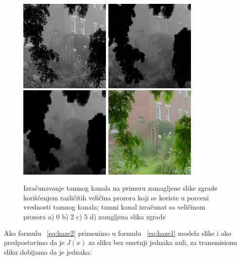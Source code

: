 \documentclass[a4paper,12pt,titlepage]{article}
\begin{document}
\begin{figure}[ht!]
\centering
\includegraphics[width=45mm]{img/hazeDC0.png}
\includegraphics[width=45mm]{img/hazeDC2.png}
\includegraphics[width=45mm]{img/hazeDC5.png}
\includegraphics[width=45mm]{img/haze.png}
\caption{Izračunavanje tamnog kanala na primeru zamagljene slike zgrade korišćenjem različitih veličina prozora koji se koriste u porceni vrednosti tamnog kanala; tamni kanal izračunat sa veličinom prozora a) 0 b) 2 c) 5 d) zamgljena slika zgrade}
\label{TamniKanal}
\end{figure}   

Ako formulu  ~\ref{eq:haze2} primenimo u formulu ~\ref{eq:haze1} modela slike i ako predpostavimo da je $J(x)$ za sliku bez smetnji jednaka nuli, za transmisionu sliku dobijamo da je jednaka:
\end{document}
